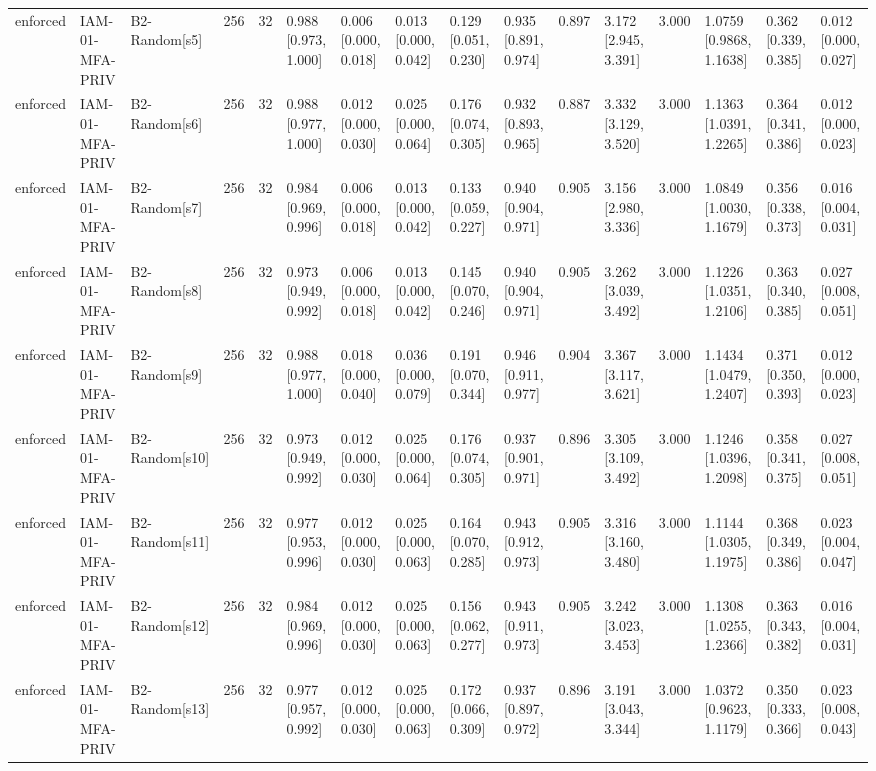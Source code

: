 \begin{table}[!ht]
{\begin{tabular}{llllllllllllllll}
enforced & IAM-01-MFA-PRIV & B2-Random[s5] & 256 & 32 & 0.988 [0.973, 1.000] & 0.006 [0.000, 0.018] & 0.013 [0.000, 0.042] & 0.129 [0.051, 0.230] & 0.935 [0.891, 0.974] & 0.897 & 3.172 [2.945, 3.391] & 3.000 & 1.0759 [0.9868, 1.1638] & 0.362 [0.339, 0.385] & 0.012 [0.000, 0.027] \\
enforced & IAM-01-MFA-PRIV & B2-Random[s6] & 256 & 32 & 0.988 [0.977, 1.000] & 0.012 [0.000, 0.030] & 0.025 [0.000, 0.064] & 0.176 [0.074, 0.305] & 0.932 [0.893, 0.965] & 0.887 & 3.332 [3.129, 3.520] & 3.000 & 1.1363 [1.0391, 1.2265] & 0.364 [0.341, 0.386] & 0.012 [0.000, 0.023] \\
enforced & IAM-01-MFA-PRIV & B2-Random[s7] & 256 & 32 & 0.984 [0.969, 0.996] & 0.006 [0.000, 0.018] & 0.013 [0.000, 0.042] & 0.133 [0.059, 0.227] & 0.940 [0.904, 0.971] & 0.905 & 3.156 [2.980, 3.336] & 3.000 & 1.0849 [1.0030, 1.1679] & 0.356 [0.338, 0.373] & 0.016 [0.004, 0.031] \\
enforced & IAM-01-MFA-PRIV & B2-Random[s8] & 256 & 32 & 0.973 [0.949, 0.992] & 0.006 [0.000, 0.018] & 0.013 [0.000, 0.042] & 0.145 [0.070, 0.246] & 0.940 [0.904, 0.971] & 0.905 & 3.262 [3.039, 3.492] & 3.000 & 1.1226 [1.0351, 1.2106] & 0.363 [0.340, 0.385] & 0.027 [0.008, 0.051] \\
enforced & IAM-01-MFA-PRIV & B2-Random[s9] & 256 & 32 & 0.988 [0.977, 1.000] & 0.018 [0.000, 0.040] & 0.036 [0.000, 0.079] & 0.191 [0.070, 0.344] & 0.946 [0.911, 0.977] & 0.904 & 3.367 [3.117, 3.621] & 3.000 & 1.1434 [1.0479, 1.2407] & 0.371 [0.350, 0.393] & 0.012 [0.000, 0.023] \\
enforced & IAM-01-MFA-PRIV & B2-Random[s10] & 256 & 32 & 0.973 [0.949, 0.992] & 0.012 [0.000, 0.030] & 0.025 [0.000, 0.064] & 0.176 [0.074, 0.305] & 0.937 [0.901, 0.971] & 0.896 & 3.305 [3.109, 3.492] & 3.000 & 1.1246 [1.0396, 1.2098] & 0.358 [0.341, 0.375] & 0.027 [0.008, 0.051] \\
enforced & IAM-01-MFA-PRIV & B2-Random[s11] & 256 & 32 & 0.977 [0.953, 0.996] & 0.012 [0.000, 0.030] & 0.025 [0.000, 0.063] & 0.164 [0.070, 0.285] & 0.943 [0.912, 0.973] & 0.905 & 3.316 [3.160, 3.480] & 3.000 & 1.1144 [1.0305, 1.1975] & 0.368 [0.349, 0.386] & 0.023 [0.004, 0.047] \\
enforced & IAM-01-MFA-PRIV & B2-Random[s12] & 256 & 32 & 0.984 [0.969, 0.996] & 0.012 [0.000, 0.030] & 0.025 [0.000, 0.063] & 0.156 [0.062, 0.277] & 0.943 [0.911, 0.973] & 0.905 & 3.242 [3.023, 3.453] & 3.000 & 1.1308 [1.0255, 1.2366] & 0.363 [0.343, 0.382] & 0.016 [0.004, 0.031] \\
enforced & IAM-01-MFA-PRIV & B2-Random[s13] & 256 & 32 & 0.977 [0.957, 0.992] & 0.012 [0.000, 0.030] & 0.025 [0.000, 0.063] & 0.172 [0.066, 0.309] & 0.937 [0.897, 0.972] & 0.896 & 3.191 [3.043, 3.344] & 3.000 & 1.0372 [0.9623, 1.1179] & 0.350 [0.333, 0.366] & 0.023 [0.008, 0.043] \\

\end{tabular}}
\end{table}
